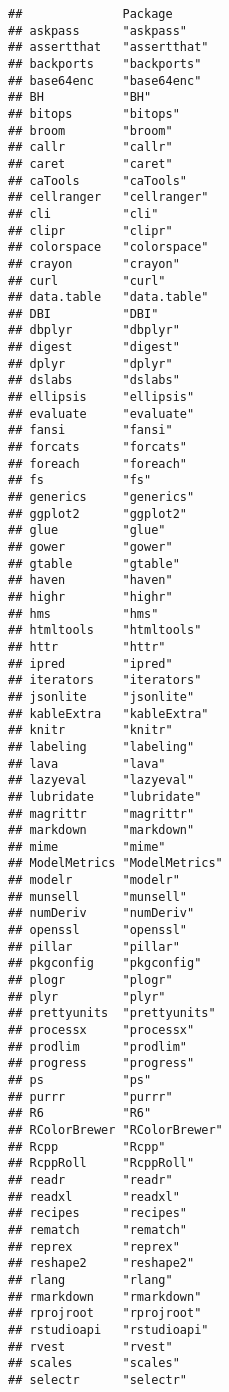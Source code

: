 \documentclass[]{article}
\begin{document}
\begin{verbatim}
##              Package       
## askpass      "askpass"     
## assertthat   "assertthat"  
## backports    "backports"   
## base64enc    "base64enc"   
## BH           "BH"          
## bitops       "bitops"      
## broom        "broom"       
## callr        "callr"       
## caret        "caret"       
## caTools      "caTools"     
## cellranger   "cellranger"  
## cli          "cli"         
## clipr        "clipr"       
## colorspace   "colorspace"  
## crayon       "crayon"      
## curl         "curl"        
## data.table   "data.table"  
## DBI          "DBI"         
## dbplyr       "dbplyr"      
## digest       "digest"      
## dplyr        "dplyr"       
## dslabs       "dslabs"      
## ellipsis     "ellipsis"    
## evaluate     "evaluate"    
## fansi        "fansi"       
## forcats      "forcats"     
## foreach      "foreach"     
## fs           "fs"          
## generics     "generics"    
## ggplot2      "ggplot2"     
## glue         "glue"        
## gower        "gower"       
## gtable       "gtable"      
## haven        "haven"       
## highr        "highr"       
## hms          "hms"         
## htmltools    "htmltools"   
## httr         "httr"        
## ipred        "ipred"       
## iterators    "iterators"   
## jsonlite     "jsonlite"    
## kableExtra   "kableExtra"  
## knitr        "knitr"       
## labeling     "labeling"    
## lava         "lava"        
## lazyeval     "lazyeval"    
## lubridate    "lubridate"   
## magrittr     "magrittr"    
## markdown     "markdown"    
## mime         "mime"        
## ModelMetrics "ModelMetrics"
## modelr       "modelr"      
## munsell      "munsell"     
## numDeriv     "numDeriv"    
## openssl      "openssl"     
## pillar       "pillar"      
## pkgconfig    "pkgconfig"   
## plogr        "plogr"       
## plyr         "plyr"        
## prettyunits  "prettyunits" 
## processx     "processx"    
## prodlim      "prodlim"     
## progress     "progress"    
## ps           "ps"          
## purrr        "purrr"       
## R6           "R6"          
## RColorBrewer "RColorBrewer"
## Rcpp         "Rcpp"        
## RcppRoll     "RcppRoll"    
## readr        "readr"       
## readxl       "readxl"      
## recipes      "recipes"     
## rematch      "rematch"     
## reprex       "reprex"      
## reshape2     "reshape2"    
## rlang        "rlang"       
## rmarkdown    "rmarkdown"   
## rprojroot    "rprojroot"   
## rstudioapi   "rstudioapi"  
## rvest        "rvest"       
## scales       "scales"      
## selectr      "selectr"     

\end{verbatim}
\end{document}
